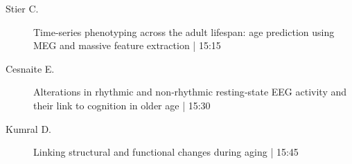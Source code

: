\begin{symposium}
\begin{description}
                \item [ Stier C.] Time-series phenotyping across the adult lifespan: age prediction using MEG and massive feature extraction \textcolor{mygray}{ | 15:15}    
                
                \item [ Cesnaite E.] Alterations in rhythmic and non‐rhythmic resting‐state EEG activity and their link to cognition in older age \textcolor{mygray}{ | 15:30}    
                
                \item [ Kumral D.] Linking structural and functional changes during aging \textcolor{mygray}{ | 15:45}    
                
            \end{description} 
            \end{symposium}
            
